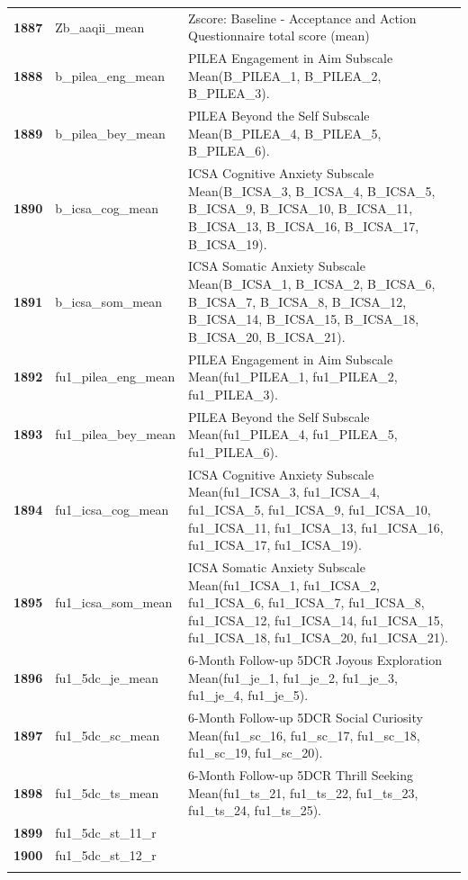 \documentclass[
  letterpaper,
  DIV=11,
  numbers=noendperiod]{scrartcl}
\begin{document}
\begin{longtable}[t]{>{}cll}
\textbf{1887} & Zb\_aaqii\_mean & Zscore:  Baseline - Acceptance and Action Questionnaire total score (mean)\\
\textbf{1888} & b\_pilea\_eng\_mean & PILEA Engagement in Aim Subscale Mean(B\_PILEA\_1, B\_PILEA\_2, B\_PILEA\_3).\\
\textbf{1889} & b\_pilea\_bey\_mean & PILEA Beyond the Self Subscale Mean(B\_PILEA\_4, B\_PILEA\_5, B\_PILEA\_6).\\
\textbf{1890} & b\_icsa\_cog\_mean & ICSA Cognitive Anxiety Subscale Mean(B\_ICSA\_3, B\_ICSA\_4, B\_ICSA\_5, B\_ICSA\_9, B\_ICSA\_10, B\_ICSA\_11, B\_ICSA\_13, B\_ICSA\_16, B\_ICSA\_17, B\_ICSA\_19).\\
\addlinespace
\textbf{1891} & b\_icsa\_som\_mean & ICSA Somatic Anxiety Subscale Mean(B\_ICSA\_1, B\_ICSA\_2, B\_ICSA\_6, B\_ICSA\_7, B\_ICSA\_8, B\_ICSA\_12, B\_ICSA\_14, B\_ICSA\_15, B\_ICSA\_18, B\_ICSA\_20, B\_ICSA\_21).\\
\textbf{1892} & fu1\_pilea\_eng\_mean & PILEA Engagement in Aim Subscale Mean(fu1\_PILEA\_1, fu1\_PILEA\_2, fu1\_PILEA\_3).\\
\textbf{1893} & fu1\_pilea\_bey\_mean & PILEA Beyond the Self Subscale Mean(fu1\_PILEA\_4, fu1\_PILEA\_5, fu1\_PILEA\_6).\\
\textbf{1894} & fu1\_icsa\_cog\_mean & ICSA Cognitive Anxiety Subscale Mean(fu1\_ICSA\_3, fu1\_ICSA\_4, fu1\_ICSA\_5, fu1\_ICSA\_9, fu1\_ICSA\_10, fu1\_ICSA\_11, fu1\_ICSA\_13, fu1\_ICSA\_16, fu1\_ICSA\_17, fu1\_ICSA\_19).\\
\textbf{1895} & fu1\_icsa\_som\_mean & ICSA Somatic Anxiety Subscale Mean(fu1\_ICSA\_1, fu1\_ICSA\_2, fu1\_ICSA\_6, fu1\_ICSA\_7, fu1\_ICSA\_8, fu1\_ICSA\_12, fu1\_ICSA\_14, fu1\_ICSA\_15, fu1\_ICSA\_18, fu1\_ICSA\_20, fu1\_ICSA\_21).\\
\addlinespace
\textbf{1896} & fu1\_5dc\_je\_mean & 6-Month Follow-up 5DCR Joyous Exploration Mean(fu1\_je\_1, fu1\_je\_2, fu1\_je\_3, fu1\_je\_4, fu1\_je\_5).\\
\textbf{1897} & fu1\_5dc\_sc\_mean & 6-Month Follow-up 5DCR Social Curiosity Mean(fu1\_sc\_16, fu1\_sc\_17, fu1\_sc\_18, fu1\_sc\_19, fu1\_sc\_20).\\
\textbf{1898} & fu1\_5dc\_ts\_mean & 6-Month Follow-up 5DCR Thrill Seeking Mean(fu1\_ts\_21, fu1\_ts\_22, fu1\_ts\_23, fu1\_ts\_24, fu1\_ts\_25).\\
\textbf{1899} & fu1\_5dc\_st\_11\_r & \\
\textbf{1900} & fu1\_5dc\_st\_12\_r & \\
\addlinespace

\end{longtable}
\end{document}
